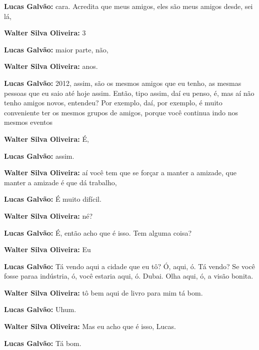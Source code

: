 \textbf{Lucas Galvão:} cara. Acredita que meus amigos, eles são meus amigos desde, sei lá,



\textbf{Walter Silva Oliveira:} 3



\textbf{Lucas Galvão:} maior parte, não,



\textbf{Walter Silva Oliveira:} anos.



\textbf{Lucas Galvão:} 2012, assim, são os mesmos amigos que eu tenho, as mesmas pessoas que eu saio até hoje assim. Então, tipo assim, daí eu penso, é, mas aí não tenho amigos novos, entendeu? Por exemplo, daí, por exemplo, é muito conveniente ter os mesmos grupos de amigos, porque você continua indo nos mesmos eventos



\textbf{Walter Silva Oliveira:} É,



\textbf{Lucas Galvão:} assim.



\textbf{Walter Silva Oliveira:} aí você tem que se forçar a manter a amizade, que manter a amizade é que dá trabalho,



\textbf{Lucas Galvão:} É muito difícil.



\textbf{Walter Silva Oliveira:} né?



\textbf{Lucas Galvão:} É, então acho que é isso. Tem alguma coisa?



\textbf{Walter Silva Oliveira:} Eu



\textbf{Lucas Galvão:} Tá vendo aqui a cidade que eu tô? Ó, aqui, ó. Tá vendo? Se você fosse paraa indústria, ó, você estaria aqui, ó. Dubai. Olha aqui, ó, a visão bonita.



\textbf{Walter Silva Oliveira:} tô bem aqui de livro para mim tá bom.



\textbf{Lucas Galvão:} Uhum.



\textbf{Walter Silva Oliveira:} Mas eu acho que é isso, Lucas.



\textbf{Lucas Galvão:} Tá bom.



